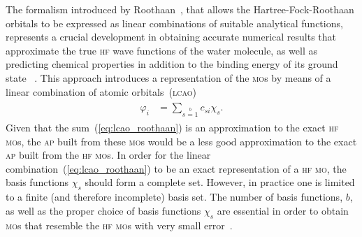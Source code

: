 The formalism introduced by Roothaan~\cite{Roothaan_HF}, that allows
the Hartree-Fock-Roothaan orbitals to be expressed as linear
combinations of suitable analytical functions, represents a crucial
development in obtaining accurate numerical results that approximate
the true \textsc{hf} wave functions of the water molecule, as well as
predicting chemical properties in addition to the binding energy of
its ground state
~\cite{scf_lc_1967,EllisonShullh2o_1955,Neumann_gaussian_1968,Pitzer_1970,Pitzer_1972}.
This approach introduces a representation of the \textsc{mo}s by
means of a linear combination of atomic
orbitals~(\textsc{lcao})~\cite{Roothaan_HF}
%
\begin{eqnarray}
  \begin{split}
    \varphi_{i} & = \sum\limits_{s=1}\limits^{b} c_{si} \chi_{s}.
  \end{split}
  \label{eq:lcao_roothaan}
\end{eqnarray}
%
Given that the sum~(\ref{eq:lcao_roothaan}) is an approximation to the
exact \textsc{hf} \textsc{mo}s, the \textsc{ap} built from these
\textsc{mo}s would be a less good approximation to the exact
\textsc{ap} built from the \textsc{hf} \textsc{mo}s. In order for the
linear combination~(\ref{eq:lcao_roothaan}) to be an exact
representation of a \textsc{hf} \textsc{mo}, the basis functions
$\chi_{s}$ should form a complete set. However, in practice one is
limited to a finite (and therefore incomplete) basis set. The number
of basis functions, $b$, as well as the proper choice of basis
functions $\chi_{s}$ are essential in order to obtain \textsc{mo}s
that resemble the \textsc{hf} \textsc{mo}s with very small
error~\cite{Moccia_JCP_2164,Moccia_JCP_2176,Moccia_1964}.


